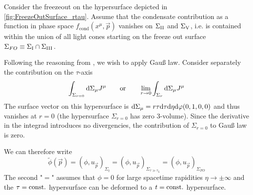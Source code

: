 
Consider the freezeout on the hypersurface depicted in \ref{fig:FreezeOutSurface_rtau}. Assume that the condensate contribution as a function in phase space $f_{\text{cond}}(x^\mu,\vec{p})$ vanishes on $\Sigma_{\text{\rom{2}}}$ and $\Sigma_{\text{\rom{5}}}$, i.e. is contained within the union of all light cones starting on the freeze out surface $\Sigma_{FO}\equiv\Sigma_{\text{\rom{1}}}\cap\Sigma_\text{{\rom{3}}}$. 

Following the reasoning from \cite{KirchnerEtAl_2023}, we wish to apply Gauß law. Consider separately the contribution on the $\tau$-axis
\begin{equation*}
    \int_{\Sigma_{r=0}}\text{d}\Sigma_\mu J^\mu\qquad\text{or}\qquad\lim_{r\to 0}\int_{\Sigma_{r}}\text{d}\Sigma_\mu J^\mu
\end{equation*}
The surface vector on this hypersurface is $\text{d}\Sigma_\mu=r\tau\text{d}\tau\text{d}\eta\text{d}\varphi(0,1,0,0)$ and thus vanishes at $r=0$ (the hypersurface $\Sigma_{r=0}$ has zero $3$-volume). Since the derivative in the integrad introduces no divergencies, the contribution of $\Sigma_{r=0}$ to Gauß law is zero.

We can therefore write
\begin{equation}
    \tilde{\phi}(\vec{p})=(\phi,u_{\vec{p}})_{\Sigma_t}=(\phi,u_{\vec{p}})_{\Sigma_{\tau\gg\tau_L}}=(\phi,u_{\vec{p}})_{\Sigma_{FO}}
\end{equation}
The second "$=$" assumes that $\phi=0$ for large spacetime rapidities $\eta\to\pm\infty$ and the $\tau={\text{const.}}$ hypersurface can be deformed to a $t={\text{const.}}$ hypersurface.


